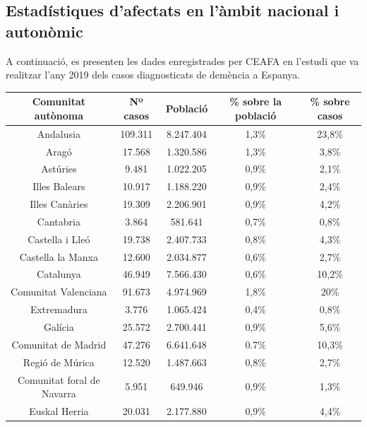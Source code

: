\documentclass[a4paper,12pt]{article}
\begin{document}
\subsection*{Estadístiques d'afectats en l'àmbit nacional i autonòmic}
A continuació, es presenten les dades enregistrades per CEAFA en l'estudi que va realitzar l'any 2019 dels casos diagnosticats de demència a Espanya.
\begin{table}[h]
    \centering
    \begin{tabular}{ |c | c | c | c | c| } 
        \hline
        \hline Comunitat autònoma & Nº casos & Població & \% sobre la població & \% sobre casos\\
        \hline
         Andalusia & 109.311 & 8.247.404 & 1,3\% & 23,8\% \\
         \hline
         Aragó & 17.568 & 1.320.586 & 1,3\% & 3,8\% \\
         \hline
         Astúries & 9.481 & 1.022.205 & 0,9\% & 2,1\% \\
         \hline
         Illes Balears & 10.917 & 1.188.220 & 0,9\% & 2,4\% \\
          \hline
         Illes Canàries & 19.309 & 2.206.901 & 0,9\% & 4,2\% \\
          \hline
         Cantabria & 3.864 & 581.641 & 0,7\% & 0,8\% \\
          \hline
         Castella i Lleó & 19.738 & 2.407.733 & 0,8\% & 4,3\% \\
          \hline
         Castella la Manxa & 12.600 & 2.034.877 & 0,6\% & 2,7\% \\
          \hline
         Catalunya & 46.949 & 7.566.430 & 0,6\% & 10,2\% \\
          \hline
         Comunitat Valenciana & 91.673 & 4.974.969 & 1,8\% & 20\% \\ 
          \hline
         Extremadura & 3.776 & 1.065.424 & 0,4\% & 0,8\% \\
          \hline
         Galícia & 25.572 & 2.700.441 & 0,9\% & 5,6\% \\ 
          \hline
         Comunitat de Madrid & 47.276 & 6.641.648 & 0.7\% & 10,3\% \\ 
         \hline
         Regió de Múrica & 12.520 & 1.487.663 & 0,8\% & 2,7\% \\
          \hline
         Comunitat foral de Navarra & 5.951 & 649.946 & 0,9\% & 1,3\% \\ 
          \hline
         Euskal Herria & 20.031 & 2.177.880 & 0,9\% & 4,4\% \\ 

\end{tabular}
\end{table}
\end{document}
